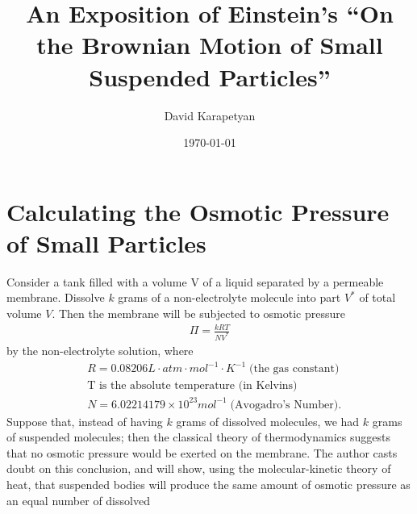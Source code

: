 \documentclass[12pt,reqno]{amsart}
\theoremstyle{plain}  %
\theoremstyle{definition}
\begin{document}
\title{An Exposition of Einstein's ``On the Brownian Motion of Small Suspended
Particles''}
\author{David Karapetyan }
\address{Department of Mathematics  \\
         University  of Notre Dame\\
		          Notre Dame, IN 46556 }
				  \date{\today}
				  \maketitle
				  \parindent0in
				  \parskip0.1in
				  \section{Calculating the Osmotic Pressure of Small Particles}
				  \setcounter{equation}{0}
				  Consider a tank filled with a volume V of a liquid separated by a
				  permeable membrane. Dissolve $k$ grams of a non-electrolyte molecule
				  into part $V^*$ of total volume $V$. Then the membrane will be
				  subjected to osmotic pressure 
				  \begin{equation*}
					  \begin{split}
						  \Pi = \frac{kRT}{NV^*}
						  \label{osmotic-pressure}
					  \end{split}
				  \end{equation*}
				  by the non-electrolyte solution, where
				  \begin{equation*}
					  \begin{split}
						  & R = 0.08206 L \cdot atm \cdot mol^{-1} \cdot K^{-1}
						  \; \text{(the gas constant)} 
						  \\
						  & \text{T is the absolute temperature (in Kelvins)}
						  \\
						  & N = 6.02214179 \times 10^{23} mol^{-1} \; \text{(Avogadro's
						  Number)}.
						  \label{osmotic-pressure-symbols}
					  \end{split}
				  \end{equation*}
Suppose that, instead of having $k$ grams of dissolved molecules, we had $k$ grams of
suspended molecules; then the classical theory of thermodynamics suggests that no
osmotic pressure would be exerted on the membrane. The author casts doubt on this
conclusion, and will show, using the molecular-kinetic theory of heat, that suspended
bodies will produce the same amount of osmotic pressure as an equal number of dissolved
\end{document}
